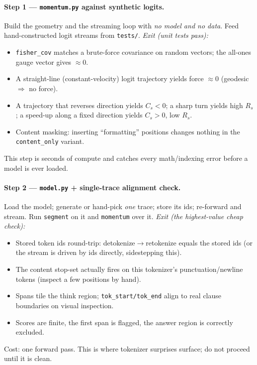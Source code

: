 \documentclass[11pt]{article}
\newcommand{\modu}[1]{\texttt{#1}}
\newcommand{\fn}[1]{\texttt{#1}}
\begin{document}
\paragraph{Step 1 --- \modu{momentum.py} against synthetic logits.} Build the geometry and the streaming loop with \emph{no model and no data}. Feed hand-constructed logit streams from \modu{tests/}. \emph{Exit (unit tests pass):}
\begin{itemize}[leftmargin=1.5em]
  \item \fn{fisher\_cov} matches a brute-force covariance on random vectors; the all-ones gauge vector gives $\approx 0$.
  \item A straight-line (constant-velocity) logit trajectory yields force $\approx 0$ (geodesic $\Rightarrow$ no force).
  \item A trajectory that reverses direction yields $C_s<0$; a sharp turn yields high $R_s$; a speed-up along a fixed direction yields $C_s>0$, low $R_s$.
  \item Content masking: inserting ``formatting'' positions changes nothing in the \texttt{content\_only} variant.
\end{itemize}
This step is seconds of compute and catches every math/indexing error before a model is ever loaded.

\paragraph{Step 2 --- \modu{model.py} + single-trace alignment check.} Load the model; generate or hand-pick \emph{one} trace; store its ids; re-forward and stream. Run \modu{segment} on it and \modu{momentum} over it. \emph{Exit (the highest-value cheap check):}
\begin{itemize}[leftmargin=1.5em]
  \item Stored token ids round-trip: detokenize$\rightarrow$retokenize equals the stored ids (or the stream is driven by ids directly, sidestepping this).
  \item The content stop-set actually fires on this tokenizer's punctuation/newline tokens (inspect a few positions by hand).
  \item Spans tile the think region; \texttt{tok\_start/tok\_end} align to real clause boundaries on visual inspection.
  \item Scores are finite, the first span is flagged, the answer region is correctly excluded.
\end{itemize}
Cost: one forward pass. This is where tokenizer surprises surface; do not proceed until it is clean.
\end{document}
